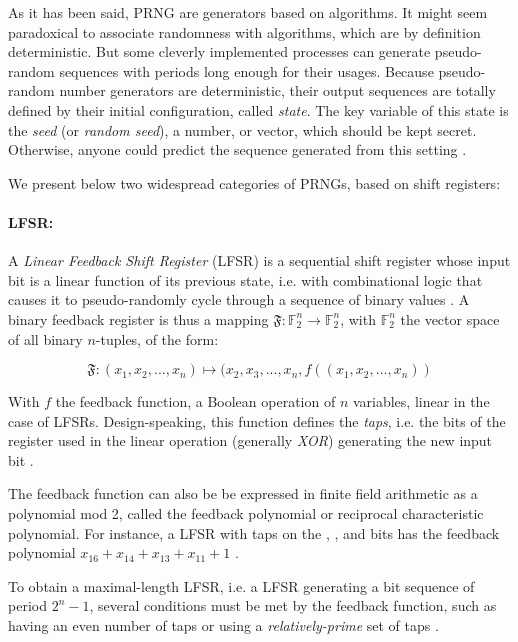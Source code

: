 \documentclass{llncs}
\begin{document}
As it has been said, PRNG are generators based on algorithms. It might seem paradoxical to associate randomness with algorithms, which are by definition deterministic. But some cleverly implemented processes can generate pseudo-random sequences with periods long enough for their usages. Because pseudo-random number generators are deterministic, their output sequences are totally defined by their initial configuration, called \emph{state}. The key variable of this state is the \emph{seed} (or \emph{random seed}), a number, or vector, which should be kept secret. Otherwise, anyone could predict the sequence generated from this setting \cite{w-rng,down}.

We present below two widespread categories of PRNGs, based on shift registers:


\paragraph{LFSR:}


A \emph{Linear Feedback Shift Register} (LFSR) is a sequential shift register whose input bit is a linear function of its previous state, i.e. with combinational logic that causes it to pseudo-randomly cycle through a sequence of binary values \cite{ray:and,joux}. A binary feedback register is thus a mapping $\mathfrak{F}:\mathbb{F}_2^n \to \mathbb{F}_2^n$, with $\mathbb{F}_2^n$ the vector space of all binary $n$-tuples, of the form:

$$\mathfrak{F}:(x_1, x_2, ..., x_n)\mapsto (x_2, x_3, ..., x_n, f((x_1, x_2, ..., x_n))$$

With $f$ the feedback function, a Boolean operation of $n$ variables, linear in the case of LFSRs. Design-speaking, this function defines the \emph{taps}, i.e. the bits of the register used in the linear operation (generally \textit{XOR}) generating the new input bit \cite{szmi,joux}.

The feedback function can also be be expressed in finite field arithmetic as a polynomial mod 2, called the feedback polynomial or reciprocal characteristic polynomial. For instance, a LFSR with taps on the , ,  and  bits has the feedback polynomial $x_{16} + x_{14} + x_{13} + x_{11} + 1$ \cite{w-lfsr}\cite{joux}.

To obtain a maximal-length LFSR, i.e. a LFSR generating a bit sequence of period $2^n-1$, several conditions must be met by the feedback function, such as having an even number of taps or using a \textit{relatively-prime} set of taps \cite{w-lfsr}\cite{joux}.
\end{document}
